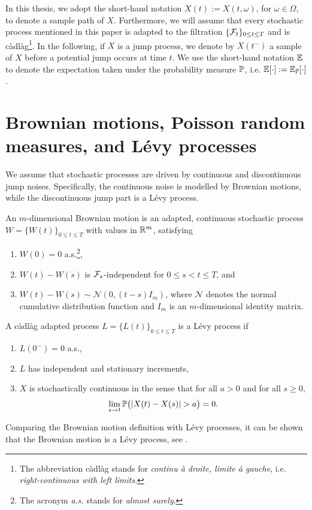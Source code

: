 In this thesis, we adopt the short-hand notation $X(t):=X(t,\omega)$, for $\omega \in \Omega$, to denote a sample path of $X$. Furthermore, we will assume that every stochastic process mentioned in this paper is adapted to the filtration $\{\mathcal{F}_t\}_{0 \leq t \leq T}$ and is càdlàg\footnote{The abbreviation càdlàg stands for \emph{continu à droite, limite à gauche}, i.e. \emph{right-continuous with left limits}.}. In the following, if $X$ is a jump process, we denote by $X(t^-)$ a sample of $X$ before a potential jump occurs at time $t$. We use the short-hand notation $\mathbb{E}$ to denote the expectation taken under the probability measure $\mathbb{P}$, i.e. $\mathbb{E}[\cdot] := \mathbb{E}_{\mathbb{P}} [\cdot]$.

\section{Brownian motions, Poisson random measures, and Lévy processes}
\label{section: Brownian motions, Poisson random measures, and Lévy processes}
We assume that stochastic processes are driven by continuous and discontinuous jump noises. Specifically, the continuous noise is modelled by Brownian motions, while the discontinuous jump part is a Lévy process. 

\begin{definition}
    An $m$-dimensional Brownian motion is an adapted, continuous stochastic process $W=\{W(t)\}_{0 \leq t \leq T}$ with values in $\mathbb{R}^m$, satisfying
    \begin{enumerate}[label=(\roman*)]
        \item $W(0) = 0$ a.s.\footnote{The acronym \textit{a.s.} stands for \textit{almost surely}.},
        \item $W(t)-W(s)$ is $\mathcal{F}_s$-independent for $0\leq s < t \leq T$, and
        \item $W(t)-W(s) \sim \mathcal{N}(0, (t-s)I_m)$, where $\mathcal N$ denotes the normal cumulative distribution function and $I_m$ is an $m$-dimensional identity matrix. 
    \end{enumerate}
\end{definition}
\begin{definition}
\label{def: Lévy process}
    A càdlàg adapted process $L=\{L(t)\}_{0 \leq t \leq T}$ is a Lévy process if 
    \begin{enumerate}[label=(\roman*)]
        \item $L(0^-)=0$ a.s.,
        \item $L$ has independent and stationary increments,
        \item $X$ is stochastically continuous in the sense that for all $a>0$ and for all $s\geq 0$,
        \begin{equation*}
            \lim_{s \rightarrow t} \Prob \big( |X(t)-X(s)|>a \big) = 0.
        \end{equation*}
    \end{enumerate}
\end{definition}
Comparing the Brownian motion definition with Lévy processes, it can be shown that the Brownian motion is a Lévy process, see \cite[Example 1.3.8]{applebaum2009levy}.

